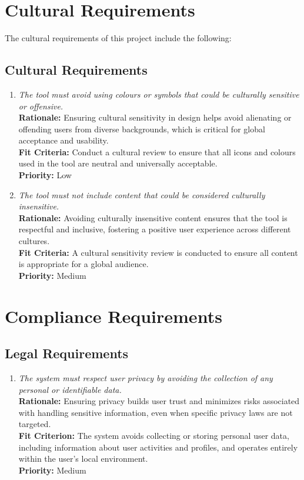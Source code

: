 \documentclass[12pt]{article}
\begin{document}
\section{Cultural Requirements}
The cultural requirements of this project include the following:
\subsection{Cultural Requirements}
\begin{enumerate}[label=CULT \arabic*., wide=0pt, leftmargin=*]
  \item \emph{The tool must avoid using colours or symbols that could
    be culturally sensitive or offensive.}\\
    {\bf Rationale:} Ensuring cultural sensitivity in design helps
    avoid alienating or offending users from diverse backgrounds,
    which is critical for global acceptance and usability.\\
    {\bf Fit Criteria:} Conduct a cultural review to ensure that all
    icons and colours used in the tool are neutral and universally acceptable.\\
    {\bf Priority:} Low

  \item \emph{The tool must not include content that could be
    considered culturally insensitive.}\\
    {\bf Rationale:} Avoiding culturally insensitive content ensures
    that the tool is respectful and inclusive, fostering a positive
    user experience across different cultures.\\
    {\bf Fit Criteria:} A cultural sensitivity review is conducted to
    ensure all content is appropriate for a global audience.\\
    {\bf Priority:} Medium

\end{enumerate}

\section{Compliance Requirements}
\subsection{Legal Requirements}
\begin{enumerate}[label=CR-LR \arabic*., wide=0pt, leftmargin=*]
  \item \emph{The system must respect user privacy by avoiding the
    collection of any personal or identifiable data.}\\[2mm]
    {\bf Rationale:} Ensuring privacy builds user trust and minimizes
    risks associated with handling sensitive information, even when
    specific privacy laws are not targeted.\\
    {\bf Fit Criterion:} The system avoids collecting or storing
    personal user data, including information about user activities
    and profiles, and operates entirely within the user’s local environment.\\
    {\bf Priority:} Medium
\end{enumerate}
\end{document}
